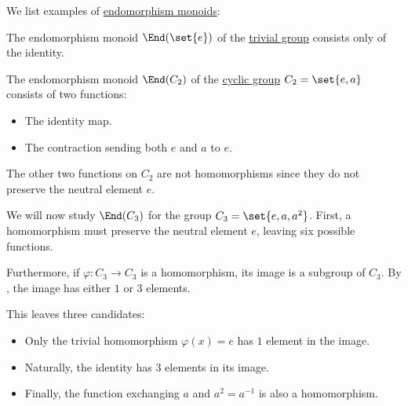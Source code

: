 \begin{example}\label{ex:def:endomorphism_monoid}
  We list examples of \hyperref[def:endomorphism_monoid]{endomorphism monoids}:
  \begin{thmenum}
     The endomorphism monoid \( \End(\set{ e }) \) of the \hyperref[def:group/trivial]{trivial group} consists only of the identity.

     The endomorphism monoid \( \End(C_2) \) of the \hyperref[def:cyclic_group]{cyclic group} \( C_2 = \set{ e, a } \) consists of two functions:
    \begin{itemize}
      \item The identity map.
      \item The contraction sending both \( e \) and \( a \) to \( e \).
    \end{itemize}

    The other two functions on \( C_2 \) are not homomorphisms since they do not preserve the neutral element \( e \).

     We will now study \( \End(C_3) \) for the group \( C_3 = \set{ e, a, a^2 } \). First, a homomorphism must preserve the neutral element \( e \), leaving six possible functions.

    Furthermore, if \( \varphi: C_3 \to C_3 \) is a homomorphism, its image is a subgroup of \( C_3 \). By , the image has either \( 1 \) or \( 3 \) elements.

    This leaves three candidates:
    \begin{itemize}
      \item Only the trivial homomorphism \( \varphi(x) = e \) has \( 1 \) element in the image.
      \item Naturally, the identity has \( 3 \) elements in its image.
      \item Finally, the function exchanging \( a \) and \( a^2 = a^{-1} \) is also a homomorphism.
    \end{itemize}
  \end{thmenum}
\end{example}

